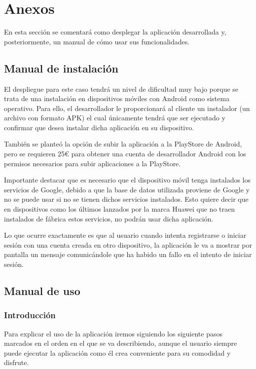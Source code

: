 \chapter{Anexos}\label{cap:manual}

En esta sección se comentará como desplegar la aplicación desarrollada y, posteriormente, un manual de cómo usar sus funcionalidades.

\section{Manual de instalación}

El despliegue para este caso tendrá un nivel de dificultad muy bajo porque se trata de una instalación en dispositivos móviles con Android como sistema operativo. Para ello, el desarrollador le proporcionará al cliente un instalador (un archivo con formato APK) el cual únicamente tendrá que ser ejecutado y confirmar que desea instalar dicha aplicación en su dispositivo.

También se planteó la opción de subir la aplicación a la PlayStore de Android, pero se requieren 25€ para obtener una cuenta de desarrollador Android con los permisos necesarios para subir aplicaciones a la PlayStore.

Importante destacar que es necesario que el dispositivo móvil tenga instalados los servicios de Google, debido a que la base de datos utilizada proviene de Google y no se puede usar si no se tienen dichos servicios instalados. Esto quiere decir que en dispositivos como los últimos lanzados por la marca Huawei que no traen instalados de fábrica estos servicios, no podrán usar dicha aplicación.

Lo que ocurre exactamente es que al usuario cuando intenta registrarse o iniciar sesión con una cuenta creada en otro dispositivo, la aplicación le va a mostrar por pantalla un mensaje comunicándole que ha habido un fallo en el intento de iniciar sesión.

\section{Manual de uso}

\subsection{Introducción}\label{sec:Uso}

Para explicar el uso de la aplicación iremos siguiendo los siguiente pasos marcados en el orden en el que se va describiendo, aunque el usuario siempre puede ejecutar la aplicación como él crea conveniente para su comodidad y disfrute.

